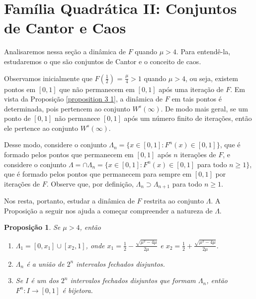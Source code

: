 \documentclass[a4paper, 12pt]{article}
\theoremstyle{definition}
\theoremstyle{plain}
\newtheorem{proposition}[definition]{Proposição}
\theoremstyle{plain}
\theoremstyle{plain}
\theoremstyle{remark}
\begin{document}
\section{Família Quadrática II: Conjuntos de Cantor e Caos}

Analisaremos nessa seção a dinâmica de $F$ quando $\mu > 4$. Para entendê-la, estudaremos o que são conjuntos de Cantor e o conceito de caos.

Observamos inicialmente que $F(\frac{1}{2})$ = $\frac{\mu}{4} > 1$ quando $\mu > 4$, ou seja, existem pontos em $[0, 1]$ que não permanecem em $[0, 1]$ após uma iteração de $F$. Em vista da Proposição \ref{proposition 3 1}, a dinâmica de $F$ em tais pontos é determinada, pois pertencem ao conjunto $W^s(\infty)$. De modo mais geral, se um ponto de $[0, 1]$ não permanece $[0, 1]$ após um número finito de iterações, então ele pertence ao conjunto $W^s(\infty)$. 

Desse modo, considere o conjunto $\Lambda_n = \{x \in [0, 1] : F^n(x) \in [0, 1]\}$, que é formado pelos pontos que permanecem em $[0, 1]$ após $n$ iterações de $F$, e considere o conjunto $\Lambda = \cap \Lambda_n = \{x \in [0, 1] : F^n(x) \in [0, 1]$ para todo $n \geq 1\}$, que é formado pelos pontos que permanecem para sempre em $[0, 1]$ por iterações de $F$. Observe que, por definição, $\Lambda_n \supset \Lambda_{n+1}$ para todo $n \geq 1$.

Nos resta, portanto, estudar a dinâmica de $F$ restrita ao conjunto $\Lambda$. A Proposição a seguir nos ajuda a começar compreender a natureza de $\Lambda$.

\begin{proposition}
\label{proposition 4 1}
Se $\mu > 4$, então
\begin{enumerate}
\item $\Lambda_1 = [0, x_1] \cup [x_2, 1]$, onde $x_1 = \frac{1}{2} - \frac{\sqrt{\mu^2 - 4\mu}}{2\mu}$ e $x_2 = \frac{1}{2} + \frac{\sqrt{\mu^2 - 4\mu}}{2\mu}$.
\item $\Lambda_n$ é a união de $2^n$ intervalos fechados disjuntos.
\item Se $I$ é um dos $2^n$ intervalos fechados disjuntos que formam $\Lambda_n$, então $F^n: I \rightarrow [0, 1]$ é bijetora.
\end{enumerate}
\end{proposition}
\end{document}
